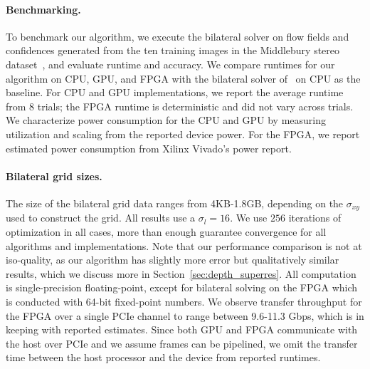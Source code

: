 \paragraph{Benchmarking.} To benchmark our algorithm, we execute the bilateral solver on flow fields and confidences generated from the ten training images in the Middlebury stereo dataset~\cite{middlebury-data}, and evaluate runtime and accuracy. 
We compare runtimes for our algorithm on CPU, GPU, and FPGA with the bilateral solver of~\cite{BarronPoole2016} on CPU as the baseline.
For CPU and GPU implementations, we report the average runtime from $8$ trials; the FPGA runtime is deterministic and did not vary across trials. 
We characterize power consumption for the CPU and GPU by measuring utilization and scaling from the reported device power.
For the FPGA, we report estimated power consumption from Xilinx Vivado's power report.

\paragraph{Bilateral grid sizes.} The size of the bilateral grid data ranges from 4KB-1.8GB, depending on the $\sigma_{xy}$ used to construct the grid.
All results use a $\sigma_{l} = 16$. 
We use $256$ iterations of optimization in all cases, more than enough guarantee convergence for all algorithms and implementations. 
Note that our performance comparison is not at iso-quality, as our algorithm has slightly more error but qualitatively similar results, which we discuss more in Section~\ref{sec:depth_superres}.
All computation is single-precision floating-point, except for bilateral solving on the FPGA which is conducted with 64-bit fixed-point numbers.
We observe transfer throughput for the FPGA over a single PCIe channel to range between 9.6-11.3 Gbps, which is in keeping with reported estimates.
Since both GPU and FPGA communicate with the host over PCIe and we assume frames can be pipelined, we omit the transfer time between the host processor and the device from reported runtimes.


